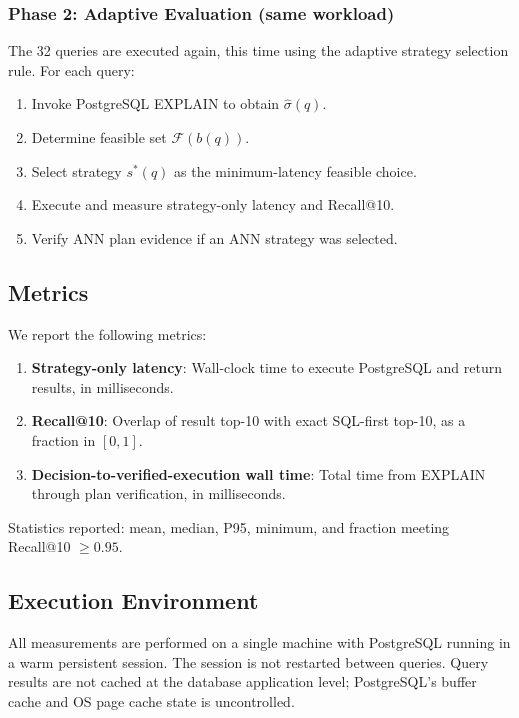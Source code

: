 \documentclass[10pt,twocolumn]{article}
\begin{document}
\subsubsection{Phase 2: Adaptive Evaluation (same workload)}

The 32 queries are executed again, this time using the adaptive strategy selection rule. For each query:
\begin{enumerate}
\item Invoke PostgreSQL EXPLAIN to obtain $\hat{\sigma}(q)$.
\item Determine feasible set $\mathcal{F}(b(q))$.
\item Select strategy $s^*(q)$ as the minimum-latency feasible choice.
\item Execute and measure strategy-only latency and Recall@10.
\item Verify ANN plan evidence if an ANN strategy was selected.
\end{enumerate}

\subsection{Metrics}

We report the following metrics:

\begin{enumerate}
\item \textbf{Strategy-only latency}: Wall-clock time to execute PostgreSQL and return results, in milliseconds.
\item \textbf{Recall@10}: Overlap of result top-10 with exact SQL-first top-10, as a fraction in $[0, 1]$.
\item \textbf{Decision-to-verified-execution wall time}: Total time from EXPLAIN through plan verification, in milliseconds.
\end{enumerate}

Statistics reported: mean, median, P95, minimum, and fraction meeting Recall@10 $\geq 0.95$.

\subsection{Execution Environment}

All measurements are performed on a single machine with PostgreSQL running in a warm persistent session. The session is not restarted between queries. Query results are not cached at the database application level; PostgreSQL's buffer cache and OS page cache state is uncontrolled.
\end{document}
